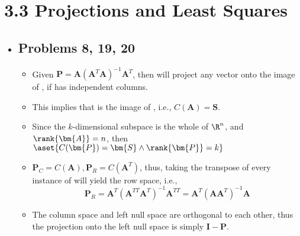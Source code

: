 \section{3.3 Projections and Least Squares}
\begin{itemize}
  \item[]

  \subsection{Problems 8, 19, 20}
  \begin{enumerate}
    \begin{itemize}
      \item Given \(\bm{P} = \bm{A}(\bm{A}^T \bm{A})^{-1} \bm{A}^T \), then
         will project any vector onto the image of , if 
        has independent columns.
      \item This implies that  is the image of , i.e.,
        \(C(\bm{A}) = \bm{S}\).
      \item Since the \(k\)-dimensional subspace  is the whole of
        \(\R^n\), and \(\rank{\bm{A}} = n \), then \(\aset{C(\bm{P}) = \bm{S} \land
        \rank{\bm{P}} = k} \)
    \end{itemize}


    \begin{itemize}
      \item \(\bm{P}_C = C(\bm{A}), \bm{P}_R = C(\bm{A}^T )\), thus, taking the
        transpose of every instance of  will yield the row space, i.e.,
      \[%
        \bm{P}_R = \bm{A}^T \left( \bm{A}^{TT} \bm{A}^T\right)^{-1} \bm{A}^{TT} =
        \bm{A}^T (\bm{A}\bm{A}^T )^{-1}\bm{A}
      \]%
    \end{itemize}

    \begin{itemize}
      \item The column space and left null space are orthogonal to each other,
        thus the projection onto the left null space is simply \(\bm{I} - \bm{P}\).
    \end{itemize}




  \end{enumerate}

\end{itemize}

